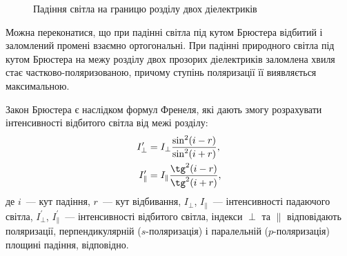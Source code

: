 \begin{figure}[!h]\centering
{}
\caption{Падіння світла на границю розділу двох діелектриків}
\label{fig:Intermedia}
\end{figure}

Можна переконатися, що при падінні світла під кутом Брюстера відбитий і заломлений промені взаємно ортогональні. При падінні природного світла під кутом Брюстера на межу розділу двох прозорих діелектриків заломлена хвиля стає частково-поляризованою, причому ступінь поляризації її виявляється максимальною.

Закон Брюстера є наслідком формул Френеля, які дають змогу розрахувати інтенсивності відбитого світла від межі розділу:
\begin{align}
    I_{\perp}^{\prime} &= I_{\perp}\frac{\sin^2(i - r)}{\sin^2(i + r)}, \\
    I_{\parallel}^{\prime} &= I_{\parallel}\frac{\tg^2(i - r)}{\tg^2(i + r)}, \label{eq:FrenselParallel}
\end{align}
де $i$~--- кут падіння, $r$~--- кут відбивання, $I_{\perp}$, $I_{\parallel}$~--- інтенсивності падаючого світла, $I_{\perp}^{\prime}$, $I_{\parallel}^{\prime}$~--- інтенсивності відбитого світла, індекси $\perp$ та $\parallel$ відповідають поляризації, перпендикулярній ($s$-поляризація) і паралельній ($p$-поляризація) площині падіння, відповідно.
